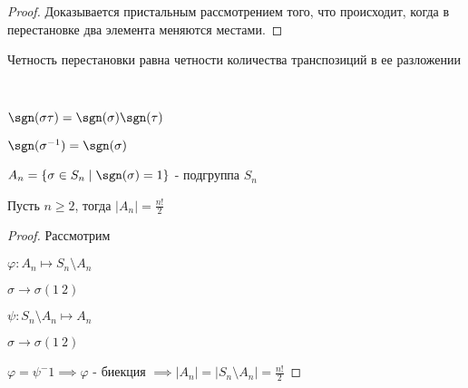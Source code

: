 \begin{proof}
    Доказывается пристальным рассмотрением того, что происходит, когда в перестановке два элемента меняются местами.
\end{proof}

\begin{follow}
    Четность перестановки равна четности количества транспозиций в ее разложении
\end{follow}

\begin{follow}~

    $\sgn(\sigma \tau) = \sgn(\sigma) \sgn(\tau)$

    $\sgn(\sigma ^{-1}) = \sgn(\sigma)$
\end{follow}

$A_n = \{\sigma \in S_n \mid \sgn(\sigma) = 1\}$ - подгруппа $S_n$

\begin{theorem-non}
    Пусть $n \ge 2$, тогда $|A_n| = \frac{n!}{2}$ 
\end{theorem-non}

\begin{proof}
    Рассмотрим 

    $\varphi: A_n \mapsto S_n \setminus A_n$
    
    $\sigma \to \sigma(1 ~2)$

    $\psi: S_n \setminus A_n \mapsto A_n$

    $\sigma \to \sigma(1 ~2)$

    $\varphi = \psi^-1 \implies \varphi$ - биекция $\implies |A_n| = |S_n \setminus A_n| = \frac{n!}{2}$
\end{proof}